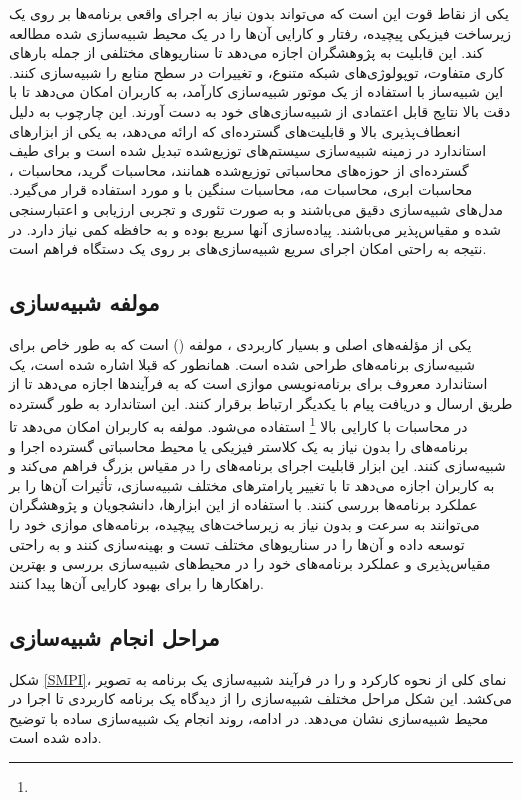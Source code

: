 یکی از نقاط قوت  این است که می‌تواند بدون نیاز به اجرای واقعی برنامه‌ها بر روی یک زیرساخت فیزیکی پیچیده، رفتار و کارایی آن‌ها را در یک محیط شبیه‌سازی شده مطالعه کند. این قابلیت به پژوهشگران اجازه می‌دهد تا سناریوهای مختلفی از جمله بارهای کاری متفاوت، توپولوژی‌های شبکه متنوع، و تغییرات در سطح منابع را شبیه‌سازی کنند. این شبیه‌ساز با استفاده از یک موتور شبیه‌سازی کارآمد، به کاربران امکان می‌دهد تا با دقت بالا نتایج قابل اعتمادی از شبیه‌سازی‌های خود به دست آورند. این چارچوب به دلیل انعطاف‌پذیری بالا و قابلیت‌های گسترده‌ای که ارائه می‌دهد، به یکی از ابزارهای استاندارد در زمینه شبیه‌سازی سیستم‌های توزیع‌شده تبدیل شده است و برای طیف گسترده‌ای از حوزه‌های محاسباتی توزیع‌شده همانند، محاسبات گرید، محاسبات ، محاسبات ابری، محاسبات مه، محاسبات سنگین با  و  مورد استفاده قرار می‌گیرد. مدل‌های شبیه‌سازی  دقیق می‌باشند و به صورت تئوری و تجربی ارزیابی و اعتبارسنجی شده‌ و مقیاس‌پذیر می‌باشند. پیاده‌سازی آنها سریع بوده و به حافظه کمی نیاز دارد. در نتیجه به راحتی امکان اجرای سریع شبیه‌سازی‌های  بر روی یک دستگاه فراهم است.

\subsection{مولفه شبیه‌سازی }\label{SMPI_Sec}

یکی از مؤلفه‌های اصلی و بسیار کاربردی ،
 مولفه  () است که به طور خاص برای شبیه‌سازی برنامه‌های  طراحی شده است. همانطور که قبلا اشاره شده است،  یک استاندارد معروف برای برنامه‌نویسی موازی است که به فرآیندها اجازه می‌دهد تا از طریق ارسال و دریافت پیام با یکدیگر ارتباط برقرار کنند. این استاندارد به طور گسترده در محاسبات با کارایی بالا \footnote{} استفاده می‌شود. مولفه  به کاربران امکان می‌دهد تا برنامه‌های  را بدون نیاز به یک کلاستر فیزیکی یا محیط محاسباتی گسترده اجرا و شبیه‌سازی کنند. این ابزار قابلیت اجرای برنامه‌های  را در مقیاس بزرگ فراهم می‌کند و به کاربران اجازه می‌دهد تا با تغییر پارامترهای مختلف شبیه‌سازی، تأثیرات آن‌ها را بر عملکرد برنامه‌ها بررسی کنند. با استفاده از این ابزارها، دانشجویان و پژوهشگران می‌توانند به سرعت و بدون نیاز به زیرساخت‌های پیچیده، برنامه‌های موازی خود را توسعه داده و آن‌ها را در سناریوهای مختلف تست و بهینه‌سازی کنند و به راحتی مقیاس‌پذیری و عملکرد برنامه‌های خود را در محیط‌های شبیه‌سازی بررسی و بهترین راهکارها را برای بهبود کارایی آن‌ها پیدا کنند.
 \subsection{مراحل انجام شبیه‌سازی}
شکل \ref{SMPI}،  نمای کلی از نحوه کارکرد  و  را در فرآیند شبیه‌سازی یک برنامه  به تصویر می‌کشد. این شکل مراحل مختلف شبیه‌سازی را از دیدگاه یک برنامه کاربردی تا اجرا در محیط شبیه‌سازی نشان می‌دهد. در ادامه، روند انجام یک شبیه‌سازی ساده با  توضیح داده شده است.

